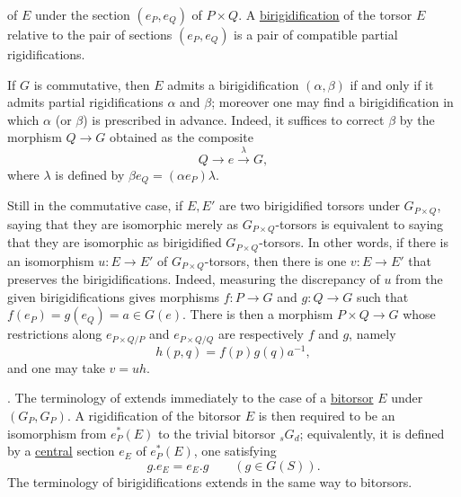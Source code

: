 of $E$ under the section $(e_P,e_Q)$ of $P\times Q$. A
\underline{birigidification} of the torsor $E$ relative to the pair of
sections $(e_P,e_Q)$ is a pair of compatible partial rigidifications.

If $G$ is commutative, then $E$ admits a birigidification
$(\alpha,\beta)$ if and only if it admits partial rigidifications
$\alpha$ and $\beta$; moreover one may find a birigidification in which
$\alpha$ (or $\beta$) is prescribed in advance. Indeed, it suffices to
correct $\beta$ by the morphism $Q\longrightarrow G$ obtained as the
composite
\[
 Q\longrightarrow e\xrightarrow{\lambda}G,
\]
where $\lambda$ is defined by
$\beta e_Q=(\alpha e_P)\lambda$.

Still in the commutative case, if $E,E'$ are two birigidified torsors
under $G_{P\times Q}$, saying that they are isomorphic merely as
$G_{P\times Q}$-torsors is equivalent to saying that they are
isomorphic as birigidified $G_{P\times Q}$-torsors. In other words, if
there is an isomorphism $u:E\longrightarrow E'$ of
$G_{P\times Q}$-torsors, then there is one
$v:E\longrightarrow E'$ that preserves the birigidifications. Indeed,
measuring the discrepancy of $u$ from the given birigidifications gives
morphisms $f:P\longrightarrow G$ and $g:Q\longrightarrow G$ such that
$f(e_P)=g(e_Q)=a\in G(e)$. There is then a morphism
$P\times Q\longrightarrow G$ whose restrictions along
$e_{P\times Q/P}$ and $e_{P\times Q/Q}$ are respectively $f$ and $g$,
namely
\[
 h(p,q)=f(p)g(q)a^{-1},
\]
and one may take $v=uh$.

. The terminology of  extends immediately to the case of a
\underline{bitorsor} $E$ under $(G_P,G_P)$. A rigidification of the
bitorsor $E$ is then required to be an isomorphism from $e_P^*(E)$ to
the trivial bitorsor ${}_sG_d$; equivalently, it is defined by a
\underline{central} section $e_E$ of $e_P^*(E)$, one satisfying
\[
 g.e_E=e_E.g\qquad(g\in G(S)).
\]
The terminology of birigidifications extends in the same way to
bitorsors.

